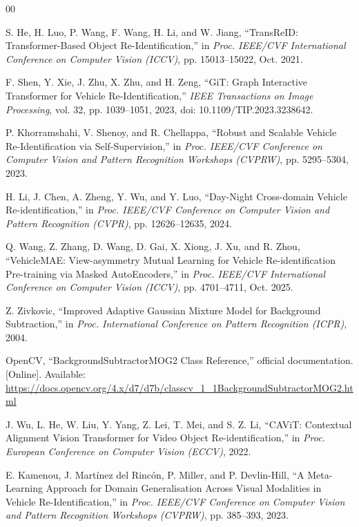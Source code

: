 \documentclass[conference]{IEEEtran}
\begin{document}
\begin{thebibliography}{00}

S. He, H. Luo, P. Wang, F. Wang, H. Li, and W. Jiang,
``TransReID: Transformer-Based Object Re-Identification,''
in \textit{Proc. IEEE/CVF International Conference on Computer Vision (ICCV)},
pp. 15013--15022, Oct. 2021.

F. Shen, Y. Xie, J. Zhu, X. Zhu, and H. Zeng,
``GiT: Graph Interactive Transformer for Vehicle Re-Identification,''
\textit{IEEE Transactions on Image Processing},
vol. 32, pp. 1039--1051, 2023, doi: 10.1109/TIP.2023.3238642.

P. Khorramshahi, V. Shenoy, and R. Chellappa,
``Robust and Scalable Vehicle Re-Identification via Self-Supervision,''
in \textit{Proc. IEEE/CVF Conference on Computer Vision and Pattern Recognition Workshops (CVPRW)},
pp. 5295--5304, 2023.

H. Li, J. Chen, A. Zheng, Y. Wu, and Y. Luo,
``Day-Night Cross-domain Vehicle Re-identification,''
in \textit{Proc. IEEE/CVF Conference on Computer Vision and Pattern Recognition (CVPR)},
pp. 12626--12635, 2024.

Q. Wang, Z. Zhang, D. Wang, D. Gai, X. Xiong, J. Xu, and R. Zhou,
``VehicleMAE: View-asymmetry Mutual Learning for Vehicle Re-identification Pre-training via Masked AutoEncoders,''
in \textit{Proc. IEEE/CVF International Conference on Computer Vision (ICCV)},
pp. 4701--4711, Oct. 2025.

Z. Zivkovic,
``Improved Adaptive Gaussian Mixture Model for Background Subtraction,''
in \textit{Proc. International Conference on Pattern Recognition (ICPR)}, 2004.

OpenCV,
``BackgroundSubtractorMOG2 Class Reference,''
official documentation. [Online].
Available: \url{https://docs.opencv.org/4.x/d7/d7b/classcv_1_1BackgroundSubtractorMOG2.html}

J. Wu, L. He, W. Liu, Y. Yang, Z. Lei, T. Mei, and S. Z. Li,
``CAViT: Contextual Alignment Vision Transformer for Video Object Re-identification,''
in \textit{Proc. European Conference on Computer Vision (ECCV)}, 2022.

E. Kamenou, J. Mart\'inez del Rinc\'on, P. Miller, and P. Devlin-Hill,
``A Meta-Learning Approach for Domain Generalisation Across Visual Modalities in Vehicle Re-Identification,''
in \textit{Proc. IEEE/CVF Conference on Computer Vision and Pattern Recognition Workshops (CVPRW)},
pp. 385--393, 2023.


\end{thebibliography}
\end{document}
